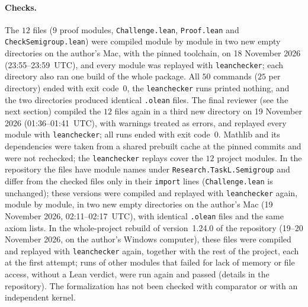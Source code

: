 \documentclass[11pt]{article}
\theoremstyle{definition}
\theoremstyle{remark}
\begin{document}
{\paragraph{Checks.}
The $12$ files ($9$ proof modules, \texttt{Challenge.lean},
\texttt{Proof.lean} and \texttt{CheckSemigroup.lean}) were compiled module by
module in two new empty directories on the author's Mac, with the pinned
toolchain, on 18 November 2026 (23:55--23:59~UTC), and every module was
replayed with \texttt{leanchecker}; each directory also ran one build of the
whole package. All $50$ commands ($25$ per directory) ended with exit
code~$0$, the \texttt{leanchecker} runs printed nothing, and the two
directories produced identical \texttt{.olean} files. The final reviewer (see
the next section) compiled the $12$ files again in a third new directory on
19 November 2026 (01:36--01:41~UTC), with warnings treated as errors, and
replayed every module with \texttt{leanchecker}; all runs ended with exit
code~$0$. Mathlib and its dependencies were taken from a shared prebuilt cache
at the pinned commits and were not rechecked; the \texttt{leanchecker} replays
cover the $12$ project modules. In the repository the files have module names under
\texttt{Research.TaskL.Semigroup} and differ from the checked files only in
their \texttt{import} lines (\texttt{Challenge.lean} is unchanged); these
versions were compiled and replayed with \texttt{leanchecker} again, module by
module, in two new empty directories on the author's Mac (19 November 2026,
02:11--02:17~UTC), with identical \texttt{.olean} files and the same axiom
lists. In the whole-project rebuild of version~1.24.0 of the repository (19--20 November 2026, on the author's Windows computer), these files were compiled and replayed with \texttt{leanchecker} again, together with the rest of the project, each at the first attempt; runs of other modules that failed for lack of memory or file access, without a Lean verdict, were run again and passed (details in the repository). The
formalization has not been checked with comparator or with an independent
kernel.

\par}
\end{document}
